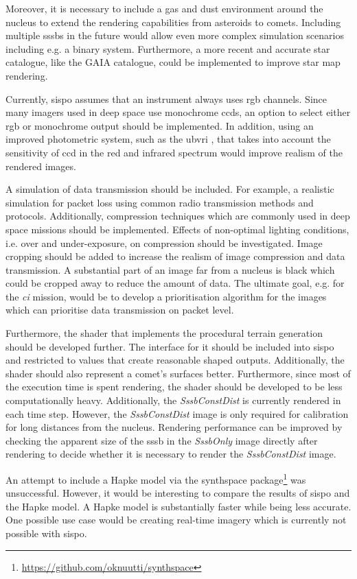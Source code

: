 Moreover, it is necessary to include a gas and dust environment around the nucleus to extend the rendering capabilities from asteroids to comets. Including multiple \glspl{sssb} in the future would allow even more complex simulation scenarios including e.g. a binary system. Furthermore, a more recent and accurate star catalogue, like the GAIA catalogue, could be implemented to improve star map rendering.

Currently, \gls{sispo} assumes that an instrument always uses \gls{rgb} channels. Since many imagers used in deep space use monochrome \glspl{ccd}, an option to select either \gls{rgb} or monochrome output should be implemented. In addition, using an improved photometric system, such as the \gls{ubvri} \cite{Bessell1993PhotometricSystems}, that takes into account the sensitivity of \gls{ccd} in the red and infrared spectrum would improve realism of the rendered images.

A simulation of data transmission should be included. For example, a realistic simulation for packet loss using common radio transmission methods and protocols. Additionally, compression techniques which are commonly used in deep space missions should be implemented. Effects of non-optimal lighting conditions, i.e. over and under-exposure, on compression should be investigated. Image cropping should be added to increase the realism of image compression and data transmission. A substantial part of an image far from a nucleus is black which could be cropped away to reduce the amount of data. The ultimate goal, e.g. for the \textit{\gls{ci}} mission, would be to develop a prioritisation algorithm for the images which can prioritise data transmission on packet level.

Furthermore, the shader that implements the procedural terrain generation should be developed further. The interface for it should be included into \gls{sispo} and restricted to values that create reasonable shaped outputs. Additionally, the shader should also represent a comet's surfaces better. Furthermore, since most of the execution time is spent rendering, the shader should be developed to be less computationally heavy. Additionally, the \textit{SssbConstDist} is currently rendered in each time step. However, the \textit{SssbConstDist} image is only required for calibration for long distances from the nucleus. Rendering performance can be improved by checking the apparent size of the \gls{sssb} in the \textit{SssbOnly} image directly after rendering to decide whether it is necessary to render the \textit{SssbConstDist} image.

An attempt to include a Hapke model via the synthspace package\footnote{\url{https://github.com/oknuutti/synthspace}} was unsuccessful. However, it would be interesting to compare the results of \gls{sispo} and the Hapke model. A Hapke model is substantially faster while being less accurate. One possible use case would be creating real-time imagery which is currently not possible with \gls{sispo}.